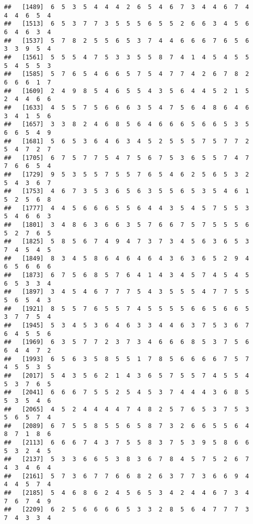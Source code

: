 \documentclass[
]{book}
\begin{document}
\begin{verbatim}
##   [1489]  6  5  3  5  4  4  4  2  6  5  4  6  7  3  4  4  6  7  4  4  4  6  5  4
##   [1513]  6  5  3  7  7  3  5  5  5  6  5  5  2  6  6  3  4  5  6  6  4  6  3  4
##   [1537]  5  7  8  2  5  5  6  5  3  7  4  4  6  6  6  7  6  5  6  3  3  9  5  4
##   [1561]  5  5  5  4  7  5  3  3  5  5  8  7  4  1  4  5  4  5  5  5  4  5  5  3
##   [1585]  5  7  6  5  4  6  6  5  7  5  4  7  7  4  2  6  7  8  2  6  6  6  1  7
##   [1609]  2  4  9  8  5  4  6  5  5  4  3  5  6  4  4  5  2  1  5  2  4  4  6  6
##   [1633]  4  5  5  7  5  6  6  6  3  5  4  7  5  6  4  8  6  4  6  3  4  1  5  6
##   [1657]  3  3  8  2  4  6  8  5  6  4  6  6  6  5  6  6  5  3  5  6  6  5  4  9
##   [1681]  5  6  5  3  6  4  6  3  4  5  2  5  5  5  7  5  7  7  2  5  4  7  2  7
##   [1705]  6  7  5  7  7  5  4  7  5  6  7  5  3  6  5  5  7  4  7  7  6  6  5  4
##   [1729]  9  5  3  5  5  7  5  5  7  6  5  4  6  2  5  6  5  3  2  5  4  3  6  7
##   [1753]  4  6  7  3  5  3  6  5  6  3  5  5  6  5  3  5  4  6  1  5  2  5  6  8
##   [1777]  4  4  5  6  6  6  5  5  6  4  4  3  5  4  5  7  5  5  3  5  4  6  6  3
##   [1801]  3  4  8  6  3  6  6  3  5  7  6  6  7  5  7  5  5  5  6  5  2  7  6  5
##   [1825]  5  8  5  6  7  4  9  4  7  3  7  3  4  5  6  3  6  5  3  7  4  5  4  5
##   [1849]  8  3  4  5  8  6  4  6  4  6  4  3  6  3  6  5  2  9  4  6  5  6  6  6
##   [1873]  6  7  5  6  8  5  7  6  4  1  4  3  4  5  7  4  5  4  5  6  5  3  3  4
##   [1897]  3  4  5  4  6  7  7  7  5  4  3  5  5  5  4  7  7  5  5  5  6  5  4  3
##   [1921]  8  5  5  7  6  5  5  7  4  5  5  5  5  6  6  5  6  6  5  3  7  7  5  4
##   [1945]  5  3  4  5  3  6  4  6  3  3  4  4  6  3  7  5  3  6  7  6  4  5  5  6
##   [1969]  6  3  5  7  7  2  3  7  3  4  6  6  6  8  5  3  7  5  6  6  4  4  7  2
##   [1993]  6  5  6  3  5  8  5  5  1  7  8  5  6  6  6  6  7  5  7  4  5  5  3  5
##   [2017]  5  4  3  5  6  2  1  4  3  6  5  7  5  5  7  4  5  5  4  5  3  7  6  5
##   [2041]  6  6  6  7  5  5  2  5  4  5  3  7  4  4  4  3  6  8  5  5  3  5  4  6
##   [2065]  4  5  2  4  4  4  4  7  4  8  2  5  7  6  5  3  7  5  3  5  6  5  7  4
##   [2089]  6  7  5  5  8  5  5  6  5  8  7  3  2  6  6  5  5  6  4  8  7  1  8  6
##   [2113]  6  6  6  7  4  3  7  5  5  8  3  7  5  3  9  5  8  6  6  5  3  2  4  5
##   [2137]  5  3  3  6  6  5  3  8  3  6  7  8  4  5  7  5  2  6  7  4  3  4  6  4
##   [2161]  5  7  3  6  7  7  6  6  8  2  6  3  7  7  3  6  6  9  4  4  4  5  7  4
##   [2185]  5  4  6  8  6  2  4  5  6  5  3  4  2  4  4  6  7  3  4  7  6  7  4  9
##   [2209]  6  2  5  6  6  6  6  5  3  3  2  8  5  6  4  7  7  7  3  7  4  3  3  4

\end{verbatim}
\end{document}
